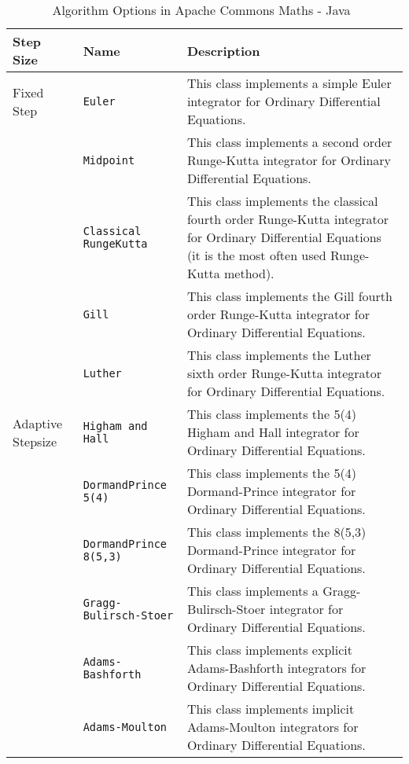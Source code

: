 \begin{table}[ht]
\begin{tabular}{ p{} | p{} p{} }
	\textbf{Step Size} & \textbf{Name} & \textbf{Description} \\
	\toprule
	Fixed Step & \verb|Euler| & This class implements a simple Euler integrator for Ordinary Differential Equations.\\ \hline
	& \verb|Midpoint| & This class implements a second order Runge-Kutta integrator for Ordinary Differential Equations.\\ \hline
	& \verb|Classical RungeKutta| & This class implements the classical fourth order Runge-Kutta integrator for Ordinary Differential Equations (it is the most often used Runge-Kutta method).\\ \hline
	& \verb|Gill| & This class implements the Gill fourth order Runge-Kutta integrator for Ordinary Differential Equations.\\ \hline
	& \verb|Luther| & This class implements the Luther sixth order Runge-Kutta integrator for Ordinary Differential Equations.\\ \hline
	Adaptive Stepsize & \verb|Higham and Hall| & This class implements the 5(4) Higham and Hall integrator for Ordinary Differential Equations.\\ \hline
	& \verb|DormandPrince 5(4)| & This class implements the 5(4) Dormand-Prince integrator for Ordinary Differential Equations.\\ \hline
	& \verb|DormandPrince 8(5,3)| & This class implements the 8(5,3) Dormand-Prince integrator for Ordinary Differential Equations.\\ \hline
	& \verb|Gragg-Bulirsch-Stoer| & This class implements a Gragg-Bulirsch-Stoer integrator for Ordinary Differential Equations.\\ \hline
	& \verb|Adams-Bashforth| & This class implements explicit Adams-Bashforth integrators for Ordinary Differential Equations.\\ \hline
	& \verb|Adams-Moulton| & This class implements implicit Adams-Moulton integrators for Ordinary Differential Equations.\\
	\bottomrule	
\end{tabular}	
\caption{Algorithm Options in Apache Commons Maths - Java~\citep{apachefun}}	
\label{tab_algacm}
\end{table}

